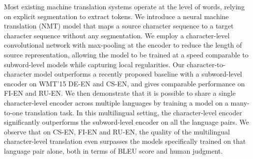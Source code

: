 Most existing machine translation systems operate at the level of words, relying on explicit segmentation to extract tokens. We introduce a neural machine translation (NMT) model that maps a source character sequence to a target character sequence without any segmentation. We employ a character-level convolutional network with max-pooling at the encoder to reduce the length of source representation, allowing the model to be trained at a speed comparable to subword-level models while capturing local regularities. Our character-to-character model outperforms a recently proposed baseline with a subword-level encoder on WMT'15 DE-EN and CS-EN, and gives comparable performance on FI-EN and RU-EN. We then demonstrate that it is possible to share a single character-level encoder across multiple languages by training a model on a many-to-one translation task. In this multilingual setting, the character-level encoder significantly outperforms the subword-level encoder on all the language pairs. We observe that on CS-EN, FI-EN and RU-EN, the quality of the multilingual character-level translation even surpasses the models specifically trained on that language pair alone, both in terms of BLEU score and human judgment.